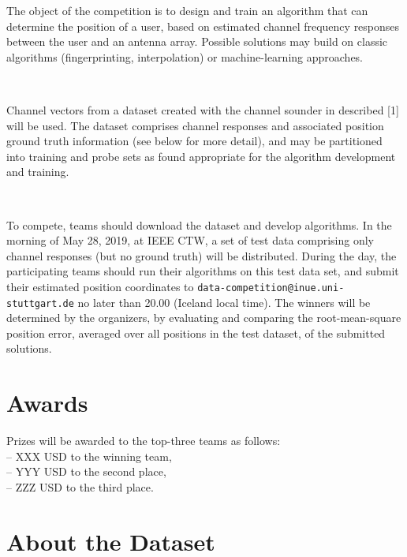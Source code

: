 \documentclass[letter]{moderncv} %
\begin{document}
The object of the competition is to design and train an algorithm that can determine the position of a user, based
on estimated channel frequency responses between the user  and  an antenna array. 
Possible solutions may build on classic algorithms (fingerprinting, interpolation) or  machine-learning   approaches. 

~

Channel vectors from  a dataset created with the channel sounder in described [1] will be used.  
The dataset comprises channel responses and associated position ground truth information (see below for more detail), and may be partitioned into training and probe sets as found appropriate for
the algorithm development and training.

~

To compete, teams should download the dataset and develop algorithms. 
In the morning of May 28, 2019, at IEEE CTW, a set of test data comprising only channel responses (but no ground truth) will be distributed. 
During the day, the participating teams should run their algorithms on this test data set, and submit their
estimated position coordinates to  
\texttt{data-competition@inue.uni-stuttgart.de} no later than 20.00 (Iceland local time).
The winners will be determined by the organizers, by evaluating and comparing the root-mean-square position error, averaged over all positions in the test
dataset, of the submitted solutions.


\section{Awards}

Prizes will be awarded to the top-three teams as follows:   \\
-- XXX USD to the winning team, \\
-- YYY USD to the second place,  \\
-- ZZZ USD to the third place. 


\section{About the Dataset}
\end{document}
